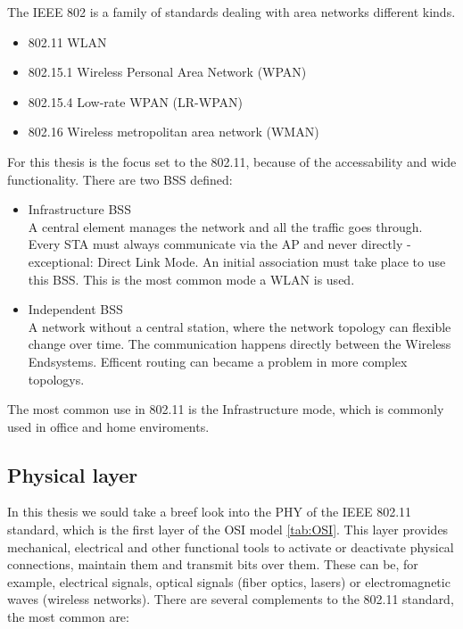 The \ac{IEEE} 802 is a family of standards dealing with area networks different kinds.
\begin{itemize}
	\item 802.11 \ac{WLAN}
	\item 802.15.1 Wireless Personal Area Network (WPAN)
	\item 802.15.4 Low-rate WPAN (LR-WPAN)
	\item 802.16 Wireless metropolitan area network (WMAN)
\end{itemize}

For this thesis is the focus set to the 802.11, because of the accessability and wide functionality.
There are two \ac{BSS} defined:
\begin{itemize}
	\label{itm:bss}
	\item Infrastructure BSS\\
	A central element manages the network and all the traffic goes through. 
	Every \ac{STA} must always communicate via the \ac{AP} and never directly - exceptional: Direct Link Mode.
	An initial association must take place to use this \ac{BSS}.
	This is the most common mode a \ac{WLAN} is used.
	\item Independent BSS\\
	A network without a central station, where the network topology can flexible change over time.
	The communication happens directly between the Wireless Endsystems.
	Efficent routing can became a problem in more complex topologys.
\end{itemize}
The most common use in 802.11 is the Infrastructure mode, which is commonly used in office and home enviroments.\\ 

\subsection{Physical layer}


In this thesis we sould take a breef look into the \ac{PHY} of the IEEE 802.11 standard, which is the first layer of the OSI model \ref{tab:OSI}.
This layer provides mechanical, electrical and other functional tools to activate or deactivate physical connections, maintain them and transmit bits over them. 
These can be, for example, electrical signals, optical signals (fiber optics, lasers) or electromagnetic waves (wireless networks).
There are several complements to the 802.11 standard, the most common are:


